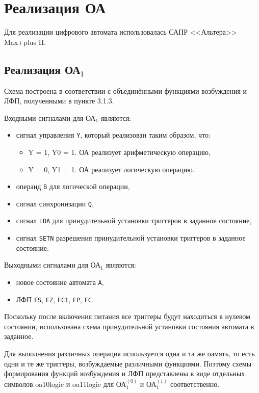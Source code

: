 
\newpage
\section{Реализация ОА}

Для реализации цифрового автомата использовалась САПР <<Альтера>> Max+plus II.

\subsection{Реализация ОА${}_1$}

Схема построена в соответствии с объединёнными функциями возбуждения и ЛФП, полученными в пункте 3.1.3.

Входными сигналами для ОА${}_1$ являются:
\begin{itemize}
	\item сигнал управления \texttt{Y}, который реализован таким образом, что:
		\begin{itemize}
			\item Y = 1, Y0 = 1. ОА реализует арифметическую операцию, 
			\item Y = 0, Y1 = 1. ОА реализует логическую операцию.
		\end{itemize}
	\item операнд \texttt{B} для логической операции,
	\item сигнал синхронизации \texttt{Q},
	\item сигнал \texttt{LDA} для принудительной установки триггеров в заданное состояние,
	\item сигнал \texttt{SETN} разрешения принудительной установки триггеров в заданное состояние.
\end{itemize}

Выходными сигналами для ОА${}_1$ являются:
\begin{itemize}
	\item новое состояние автомата \texttt{A},
	\item ЛФП \texttt{FS}, \texttt{FZ}, \texttt{FC1}, \texttt{FP}, \texttt{FC}.
\end{itemize}

Поскольку после включения питания все триггеры будут находиться в нулевом состоянии, использована схема принудительной установки состояния автомата в заданное.

Для выполнения различных операция используется одна и та же память, то есть одни и те же триггеры, возбуждаемые различными функциями. Поэтому схемы формирования функций возбуждения и ЛФП представлены в виде отдельных символов oa10\textunderscore logic и oa11\textunderscore logic для ОА$^{(0)}_{1}$ и ОА$^{(1)}_{1}$ соответственно.

